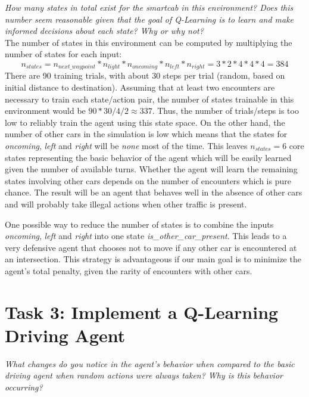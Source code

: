 \documentclass[11pt]{article}
\begin{document}
\textit{How many states in total exist for the smartcab in this environment? Does this number seem reasonable given that the goal of Q-Learning is to learn and make informed decisions about each state? Why or why not?}\\

The number of states in this environment can be computed by multiplying the number of states for each input:
\begin{equation}
n_{states} = n_{next\_waypoint} * n_{light} * n_{oncoming} * n_{left} * n_{right}  = 3 * 2 * 4 * 4 * 4 =  384
\end{equation}
There are 90 training trials, with about 30 steps per trial (random, based on initial distance to destination). Assuming that at least two encounters are necessary to train each state/action pair, the number of states trainable in this environment would be $90 * 30 / 4 / 2 \approx 337$. Thus, the number of trials/steps is too low to reliably train the agent using this state space. On the other hand, the number of other cars in the simulation is low which means that the states for \textit{oncoming}, \textit{left} and \textit{right} will be \textit{none} most of the time. This leaves $n_{states} = 6$ core states representing the basic behavior of the agent which will be easily learned given the number of available turns. Whether the agent will learn the remaining states involving other cars depends on the number of encounters which is pure chance. The result will be an agent that behaves well in the absence of other cars and will probably take illegal actions when other traffic is present.

One possible way to reduce the number of states is to combine the inputs \textit{oncoming}, \textit{left} and \textit{right} into one state \textit{is\_other\_car\_present}. This leads to a very defensive agent that chooses not to move if any other car is encountered at an intersection. This strategy is advantageous if our main goal is to minimize the agent's total penalty, given the rarity of encounters with other cars.

\section*{Task 3: Implement a Q-Learning Driving Agent}
\textit{What changes do you notice in the agent's behavior when compared to the basic driving agent when random actions were always taken? Why is this behavior occurring?}\\
\end{document}
